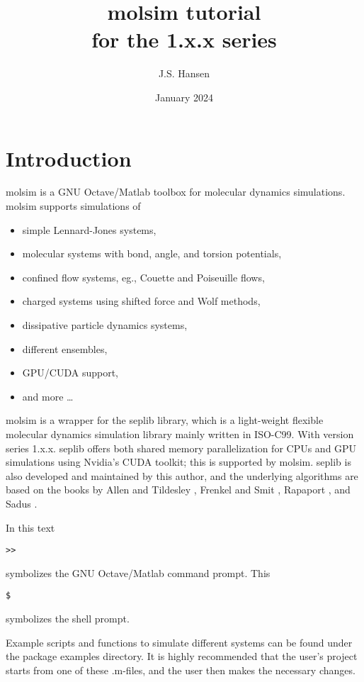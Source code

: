 \documentclass[11pt]{article}
\title{\textsf{molsim} tutorial \\ \bigskip \tiny{for the 1.x.x series}}
\author{J.S. Hansen}
\date{January 2024}
\begin{document}
\maketitle

\section{Introduction}

\textsf{molsim} is a GNU Octave/Matlab toolbox for molecular dynamics
simulations. \textsf{molsim} supports simulations of
\begin{itemize}
\item simple Lennard-Jones systems,
\item molecular systems with bond, angle, and torsion potentials, 
\item confined flow systems, eg., Couette and Poiseuille flows,
\item charged systems using shifted force and Wolf methods,
\item dissipative particle dynamics systems,
\item different ensembles, 
\item GPU/CUDA support,
\item and more \ldots
\end{itemize}

\bigskip
\noindent \textsf{molsim} is a wrapper for the \textsf{seplib}
library, which is a light-weight flexible molecular dynamics simulation library
mainly written in ISO-C99. With version series 1.x.x. \textsf{seplib} offers both 
shared memory parallelization for CPUs and GPU simulations using Nvidia's CUDA toolkit; 
this is supported by \textsf{molsim}. \textsf{seplib} is also developed and 
maintained by this author, and the underlying algorithms are based on the books by Allen and
Tildesley \cite{AllenTildesley}, Frenkel and Smit \cite{FrenkelSmit}, Rapaport
\cite{Rapaport}, and Sadus \cite{Sadus}.

\bigskip
\noindent In this text
\begin{verbatim}
>> 
\end{verbatim}
symbolizes the GNU Octave/Matlab command prompt. This 
\begin{verbatim}
$ 
\end{verbatim}
symbolizes the shell prompt.

\bigskip
\noindent Example scripts and functions to simulate different systems can be
found under the package \textsf{examples} directory. It is highly recommended that
the user's project starts from one of these \textsf{.m}-files, and the user
then makes the necessary changes.  
\end{document}
